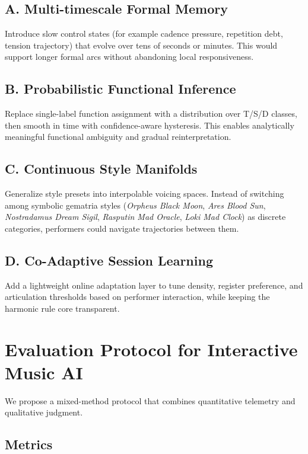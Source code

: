 \documentclass[11pt,a4paper]{article}
\begin{document}
\subsection{A. Multi-timescale Formal Memory}

Introduce slow control states (for example cadence pressure, repetition debt,
tension trajectory) that evolve over tens of seconds or minutes.
This would support longer formal arcs without abandoning local responsiveness.

\subsection{B. Probabilistic Functional Inference}

Replace single-label function assignment with a distribution over T/S/D classes,
then smooth in time with confidence-aware hysteresis.
This enables analytically meaningful functional ambiguity and gradual reinterpretation.

\subsection{C. Continuous Style Manifolds}

Generalize style presets into interpolable voicing spaces.
Instead of switching among symbolic gematria styles
(\emph{Orpheus Black Moon}, \emph{Ares Blood Sun}, \emph{Nostradamus Dream Sigil},
\emph{Rasputin Mad Oracle}, \emph{Loki Mad Clock}) as discrete categories,
performers could navigate trajectories between them.

\subsection{D. Co-Adaptive Session Learning}

Add a lightweight online adaptation layer to tune density, register preference,
and articulation thresholds based on performer interaction,
while keeping the harmonic rule core transparent.

\section{Evaluation Protocol for Interactive Music AI}

We propose a mixed-method protocol that combines quantitative telemetry and qualitative judgment.

\subsection{Metrics}
\end{document}
